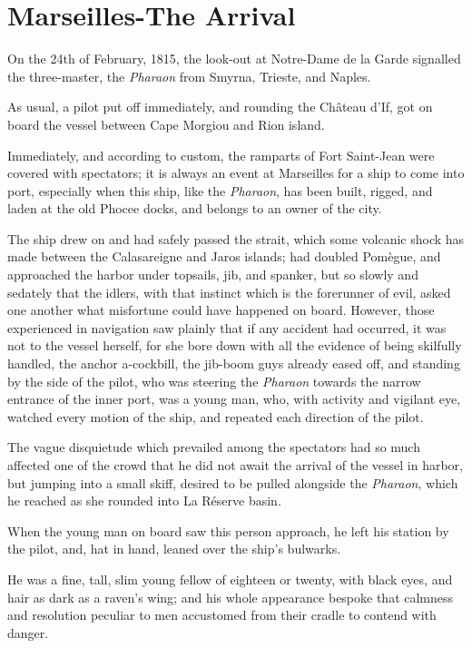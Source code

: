 \chapter{Marseilles-The Arrival}

On the 24th of February, 1815, the look-out at Notre-Dame de la Garde
signalled the three-master, the \textit{Pharaon} from Smyrna, Trieste, and
Naples.

As usual, a pilot put off immediately, and rounding the Château d’If,
got on board the vessel between Cape Morgiou and Rion island.

Immediately, and according to custom, the ramparts of Fort Saint-Jean
were covered with spectators; it is always an event at Marseilles for a
ship to come into port, especially when this ship, like the \textit{Pharaon},
has been built, rigged, and laden at the old Phocee docks, and belongs
to an owner of the city.

The ship drew on and had safely passed the strait, which some volcanic
shock has made between the Calasareigne and Jaros islands; had doubled
Pomègue, and approached the harbor under topsails, jib, and spanker,
but so slowly and sedately that the idlers, with that instinct which is
the forerunner of evil, asked one another what misfortune could have
happened on board. However, those experienced in navigation saw plainly
that if any accident had occurred, it was not to the vessel herself,
for she bore down with all the evidence of being skilfully handled, the
anchor a-cockbill, the jib-boom guys already eased off, and standing by
the side of the pilot, who was steering the \textit{Pharaon} towards the
narrow entrance of the inner port, was a young man, who, with activity
and vigilant eye, watched every motion of the ship, and repeated each
direction of the pilot.

The vague disquietude which prevailed among the spectators had so much
affected one of the crowd that he did not await the arrival of the
vessel in harbor, but jumping into a small skiff, desired to be pulled
alongside the \textit{Pharaon}, which he reached as she rounded into La
Réserve basin.

When the young man on board saw this person approach, he left his
station by the pilot, and, hat in hand, leaned over the ship’s
bulwarks.

He was a fine, tall, slim young fellow of eighteen or twenty, with
black eyes, and hair as dark as a raven’s wing; and his whole
appearance bespoke that calmness and resolution peculiar to men
accustomed from their cradle to contend with danger.

